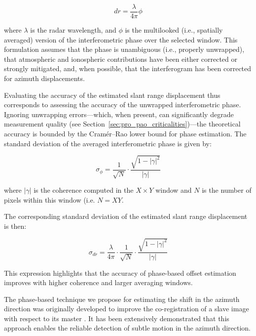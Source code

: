 \begin{equation}
dr = \frac{\lambda}{4\pi} \phi
\label{eq:dr_to_phi}
\end{equation}

where $\lambda$ is the radar wavelength, and $\phi$ is the multilooked (i.e., spatially averaged) version of the interferometric phase over the selected window. This formulation assumes that the phase is unambiguous (i.e., properly unwrapped), that atmospheric and ionospheric contributions have been either corrected or strongly mitigated, and, when possible, that the interferogram has been corrected for azimuth displacements.

Evaluating the accuracy of the estimated slant range displacement thus corresponds to assessing the accuracy of the unwrapped interferometric phase. Ignoring unwrapping errors—which, when present, can significantly degrade measurement quality (see Section~\ref{sec:pro_pao_criticalities})—the theoretical accuracy is bounded by the Cramér–Rao lower bound for phase estimation. The standard deviation of the averaged interferometric phase is given by:

\begin{equation}
\sigma_{\phi} = \frac{1}{\sqrt{N}} \cdot \frac{\sqrt{1 - |\gamma|^2}}{|\gamma|}
\label{eq:sigma_phi}
\end{equation}

where $|\gamma|$ is the coherence computed in the \(X \times Y\) window and $N$ is the number of pixels within this window (i.e. $N=X Y$.

The corresponding standard deviation of the estimated slant range displacement is then:

\begin{equation}
\sigma_{dr} = \frac{\lambda}{4\pi} \cdot \frac{1}{\sqrt{N}} \cdot \frac{\sqrt{1 - |\gamma|^2}}{|\gamma|}
\label{eq:sigma_dr}
\end{equation}

This expression highlights that the accuracy of phase-based offset estimation improves with higher coherence and larger averaging windows.

The phase-based technique we propose for estimating the shift in the azimuth direction was originally developed to improve the co-registration of a slave image with respect to its master \cite{Scheiber2000, Prats2012}. It has been extensively demonstrated that this approach enables the reliable detection of subtle motion in the azimuth direction.

